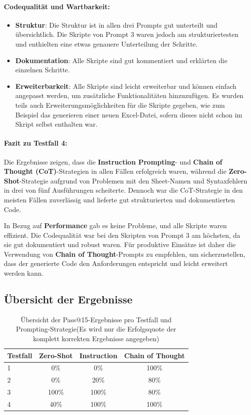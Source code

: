 \documentclass[11pt,a4paper]{article}
\begin{document}
\paragraph{Codequalität und Wartbarkeit:}
\begin{itemize}
    \item \textbf{Struktur}: Die Struktur ist in allen drei Prompts gut unterteilt und übersichtlich. Die Skripte von Prompt 3 waren jedoch am strukturiertesten und enthielten eine etwas genauere Unterteilung der Schritte.
    \item \textbf{Dokumentation}: Alle Skripte sind gut kommentiert und erklärten die einzelnen Schritte.
    \item \textbf{Erweiterbarkeit}: Alle Skripte sind leicht erweiterbar und können einfach angepasst werden, um zusätzliche Funktionalitäten hinzuzufügen. Es wurden teils auch Erweiterungsmöglichkeiten für die Skripte gegeben, wie zum Beispiel das generieren einer neuen Excel-Datei, sofern dieses nicht schon im Skript selbst enthalten war. 
\end{itemize}

\paragraph{Fazit zu Testfall 4:}
Die Ergebnisse zeigen, dass die \textbf{Instruction Prompting}- und \textbf{Chain of Thought (CoT)}-Strategien in allen Fällen erfolgreich waren, während die \textbf{Zero-Shot}-Strategie aufgrund von Problemen mit den Sheet-Namen und Syntaxfehlern in drei von fünf Ausführungen scheiterte. Dennoch war die CoT-Strategie in den meisten Fällen zuverlässig und lieferte gut strukturierten und dokumentierten Code. 

In Bezug auf \textbf{Performance} gab es keine Probleme, und alle Skripte waren effizient. Die Codequalität war bei den Skripten von Prompt 3 am höchsten, da sie gut dokumentiert und robust waren. Für produktive Einsätze ist daher die Verwendung von \textbf{Chain of Thought}-Prompts zu empfehlen, um sicherzustellen, dass der generierte Code den Anforderungen entspricht und leicht erweitert werden kann.

\subsection{Übersicht der Ergebnisse}
\begin{table}[h!]
    \centering
    \caption{Übersicht der Pass@15-Ergebnisse pro Testfall und Prompting-Strategie(Es wird nur die Erfolgsquote der komplett korrekten Ergebnisse angegeben)}
    \label{tab:pass15}
    \begin{tabular}{l|ccc}
    \hline
    \textbf{Testfall} & \textbf{Zero-Shot} & \textbf{Instruction} & \textbf{Chain of Thought} \\
    \hline
    1 & 0\% & 0\% & 100\% \\
    2 & 0\% & 20\% & 80\% \\
    3 & 100\% & 100\% & 80\% \\
    4 & 40\% & 100\% & 100\% \\
    \hline
    \end{tabular}
\end{table}
\end{document}
